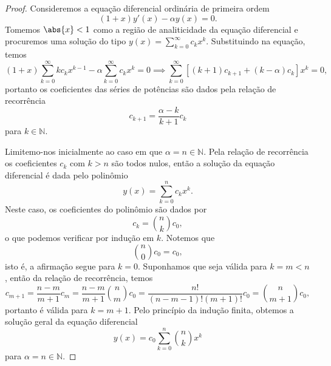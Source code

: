 \begin{proof}
    Consideremos a equação diferencial ordinária de primeira ordem
    \begin{equation*}
        (1 + x)y'(x) - \alpha y(x) = 0.
    \end{equation*}
    Tomemos \(\abs{x} < 1\) como a região de analiticidade da equação diferencial e procuremos uma solução do tipo \(y(x) = \sum_{k=0}^\infty c_k x^k\). Substituindo na equação, temos
    \begin{equation*}
        (1 + x) \sum_{k=0}^\infty kc_k x^{k-1} - \alpha \sum_{k = 0}^\infty c_kx^k = 0 \implies \sum_{k = 0}^\infty \left[(k+1)c_{k+1} + (k - \alpha)c_k \right] x^k = 0,
    \end{equation*}
    portanto os coeficientes das séries de potências são dados pela relação de recorrência
    \begin{equation*}
        c_{k+1} = \frac{\alpha - k}{k+1}c_k
    \end{equation*}
    para \(k \in \mathbb{N}\).

    Limitemo-nos inicialmente ao caso em que \(\alpha = n \in \mathbb{N}\). Pela relação de recorrência os coeficientes \(c_k\) com \(k > n\) são todos nulos, então a solução da equação diferencial é dada pelo polinômio
    \begin{equation*}
        y(x) = \sum_{k = 0}^{n} c_k x^k.
    \end{equation*}
    Neste caso, os coeficientes do polinômio são dados por
    \begin{equation*}
        c_k = \binom{n}{k}c_0,
    \end{equation*}
    o que podemos verificar por indução em \(k\). Notemos que
    \begin{equation*}
        \binom{n}{0} c_0 = c_0,
    \end{equation*}
    isto é, a afirmação segue para \(k = 0\). Suponhamos que seja válida para \(k = m < n\), então da relação de recorrência, temos
    \begin{equation*}
        c_{m+1} = \frac{n - m}{m+1}c_m = \frac{n-m}{m+1} \binom{n}{m} c_0 = \frac{n!}{(n - m - 1)! (m+1)!} c_0 = \binom{n}{m+1} c_0,
    \end{equation*}
    portanto é válida para \(k = m + 1\). Pelo princípio da indução finita, obtemos a solução geral da equação diferencial
    \begin{equation*}
        y(x) = c_0 \sum_{k = 0}^{n} \binom{n}{k}x^k
    \end{equation*}
    para \(\alpha = n \in \mathbb{N}\).


\end{proof}
